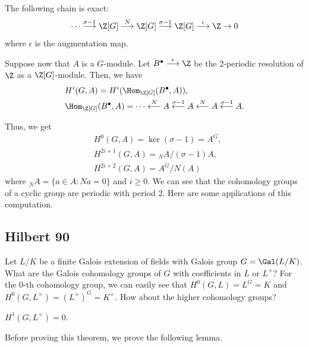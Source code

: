 \begin{corollary}
    The following chain is exact:
    \[
        \cdots \overset{\sigma-1}{\longrightarrow} \Z[G] \overset{N}{\longrightarrow}\Z[G] \overset{\sigma-1}{\longrightarrow} \Z[G] \overset{\epsilon}{\longrightarrow} \Z \to 0
    \]
    where $\epsilon$ is the augmentation map.
\end{corollary}

Suppose now that $A$ is a $G$-module.
Let $B^\bullet \overset{\epsilon}{\longrightarrow} \Z$ be the 2-periodic resolution of $\Z$ as a $\Z[G]$-module.
Then, we have
\begin{align*}
    &H^i(G, A) = H^i(\Hom_{\Z[G]}(B^\bullet, A)),\\
    &\Hom_{\Z[G]}(B^\bullet, A) = \cdots \overset{N}{\longleftarrow} A \overset{\sigma-1}{\longleftarrow} A \overset{N}{\longleftarrow} A \overset{\sigma-1}{\longleftarrow} A.
\end{align*}

Thus, we get
\begin{align*}
    &H^0(G, A) = \ker(\sigma-1) = A^G,\\
    &H^{2i+1}(G, A) = {}_N A/(\sigma-1)A,\\
    &H^{2i+2}(G, A) = A^G/N(A)
\end{align*}
where ${}_N A = \{a \in A: Na = 0\}$ and $i \geq 0$.
We can see that the cohomology groups of a cyclic group are periodic with period 2.
Here are some applications of this computation.

\subsection{Hilbert 90}

Let $L/K$ be a finite Galois extension of fields with Galois group $G = \Gal(L/K)$.
What are the Galois cohomology groups of $G$ with coefficients in $L$ or $L^\times$?
For the $0$-th cohomology group, we can easily see that
$H^0(G, L) = L^G = K$ and $H^0(G, L^\times) = (L^\times)^G = K^\times$.
How about the higher cohomology groups?
\begin{theorem}
    $H^1(G, L^\times) = 0$.
    \label{thm_hilbert90}
\end{theorem}

Before proving this theorem, we prove the following lemma.

